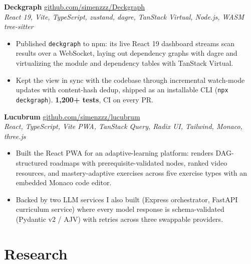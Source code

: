 \documentclass[11pt, a4paper]{article}
\begin{document}
\medskip

\textbf{Deckgraph} \hfill
  \href{https://github.com/simenzzz/Deckgraph}{github.com/simenzzz/Deckgraph} \\
\textit{React 19, Vite, TypeScript, zustand, dagre, TanStack Virtual, Node.js, WASM tree-sitter}
\begin{itemize}
  \item Published \texttt{deckgraph} to npm: its live React 19 dashboard streams
        scan results over a WebSocket, laying out dependency graphs with dagre and
        virtualizing the module and dependency tables with TanStack Virtual.
  \item Kept the view in sync with the codebase through incremental watch-mode
        updates with content-hash dedup, shipped as an installable CLI
        (\texttt{npx deckgraph}). \textbf{1{,}200+ tests}, CI on every PR.
\end{itemize}

\medskip

\textbf{Lucubrum} \hfill
  \href{https://github.com/simenzzz/lucubrum}{github.com/simenzzz/lucubrum} \\
\textit{React, TypeScript, Vite PWA, TanStack Query, Radix UI, Tailwind, Monaco, three.js}
\begin{itemize}
  \item Built the React PWA for an adaptive-learning platform: renders
        DAG-structured roadmaps with prerequisite-validated nodes, ranked video
        resources, and mastery-adaptive exercises across five exercise types with an
        embedded Monaco code editor.
  \item Backed by two LLM services I also built (Express orchestrator, FastAPI
        curriculum service) where every model response is schema-validated
        (Pydantic v2 / AJV) with retries across three swappable providers.
\end{itemize}

\section{Research}
\end{document}
